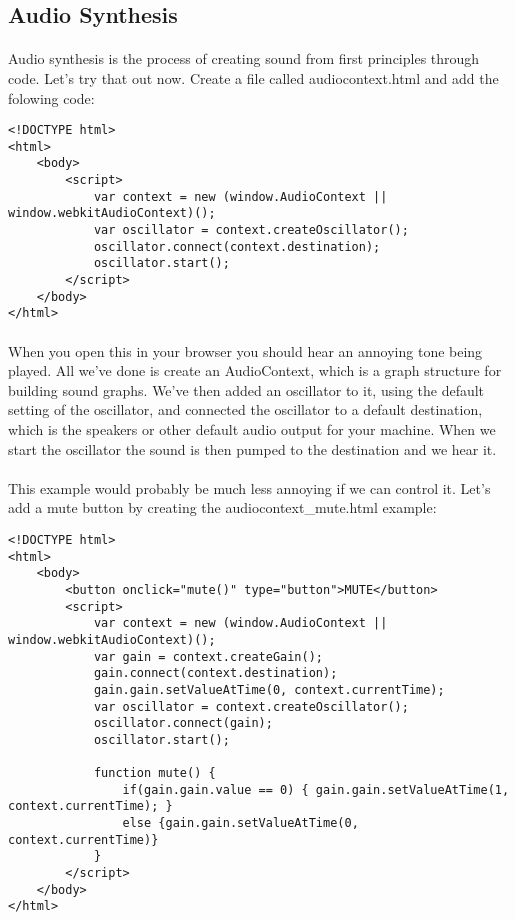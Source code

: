 \documentclass[10pt, a4paper]{article}
\begin{document}
\subsection{Audio Synthesis}
\paragraph{} Audio synthesis is the process of creating sound from first principles through code. Let's try that out now. Create a file called audiocontext.html and add the folowing code:

\begin{lstlisting}
<!DOCTYPE html>
<html>
    <body>
        <script>
            var context = new (window.AudioContext || window.webkitAudioContext)();
            var oscillator = context.createOscillator();
            oscillator.connect(context.destination);
            oscillator.start();
        </script>
    </body>
</html>
\end{lstlisting}

\paragraph{} When you open this in your browser you should hear an annoying tone being played. All we've done is create an AudioContext, which is a graph structure for building sound graphs. We've then added an oscillator to it, using the default setting of the oscillator, and connected the oscillator to a default destination, which is the speakers or other default audio output for your machine. When we start the oscillator the sound is then pumped to the destination and we hear it.

\paragraph{} This example would probably be much less annoying if we can control it. Let's add a mute button by creating the audiocontext\_mute.html example:

\begin{lstlisting}
<!DOCTYPE html>
<html>
    <body>
        <button onclick="mute()" type="button">MUTE</button>
        <script>
            var context = new (window.AudioContext || window.webkitAudioContext)();
            var gain = context.createGain();
            gain.connect(context.destination);
            gain.gain.setValueAtTime(0, context.currentTime);
            var oscillator = context.createOscillator();
            oscillator.connect(gain);
            oscillator.start();

            function mute() {
                if(gain.gain.value == 0) { gain.gain.setValueAtTime(1, context.currentTime); }
                else {gain.gain.setValueAtTime(0, context.currentTime)}
            }
        </script>
    </body>
</html>
\end{lstlisting}
\end{document}
